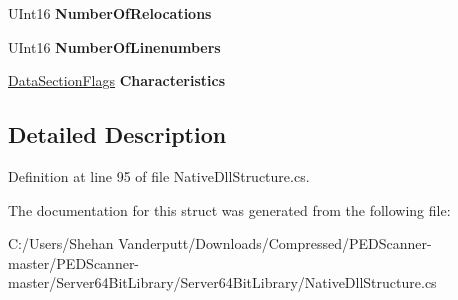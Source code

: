 \begin{DoxyCompactItemize}
U\+Int16 {\bfseries Number\+Of\+Relocations}
\item 
\mbox{\label{struct_class_library_server_1_1_struct_1_1_i_m_a_g_e___s_e_c_t_i_o_n___h_e_a_d_e_r_abe15befc903f3053ac853d4dfc4e8b78}} 
U\+Int16 {\bfseries Number\+Of\+Linenumbers}
\item 
\mbox{\label{struct_class_library_server_1_1_struct_1_1_i_m_a_g_e___s_e_c_t_i_o_n___h_e_a_d_e_r_adef1a4e3c29e8e152981d05d9fc88fdb}} 
\mbox{\hyperlink{namespace_class_library_server_1_1_struct_ad3f124300e7d61acd3a017b73b6bc9aa}{Data\+Section\+Flags}} {\bfseries Characteristics}
\end{DoxyCompactItemize}


\subsection{Detailed Description}


Definition at line 95 of file Native\+Dll\+Structure.\+cs.



The documentation for this struct was generated from the following file\+:\begin{DoxyCompactItemize}
\item 
C\+:/\+Users/\+Shehan Vanderputt/\+Downloads/\+Compressed/\+P\+E\+D\+Scanner-\/master/\+P\+E\+D\+Scanner-\/master/\+Server64\+Bit\+Library/\+Server64\+Bit\+Library/Native\+Dll\+Structure.\+cs\end{DoxyCompactItemize}
